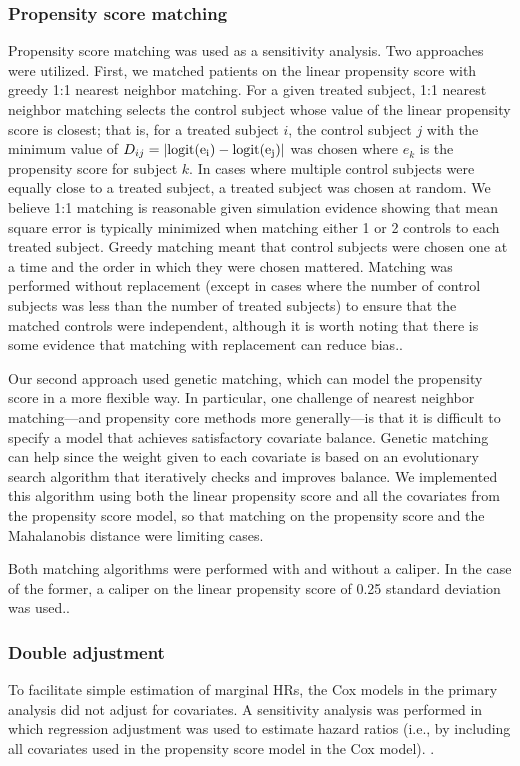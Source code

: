 \documentclass[11pt,final,fleqn]{article}\usepackage[]{graphicx}\usepackage[]{color}
\begin{document}
\subsubsection{Propensity score matching}
Propensity score matching was used as a sensitivity analysis. Two approaches were utilized. First, we matched patients on the linear propensity score with greedy 1:1 nearest neighbor matching. For a given treated subject, 1:1 nearest neighbor matching selects the control subject whose value of the linear propensity score is closest; that is, for a treated subject $i$, the control subject $j$ with the minimum value of $D_{ij}=|\rm{logit}(e_i)-\rm{logit}(e_j)|$ was chosen where $e_{k}$ is the propensity score for subject $k$. In cases where multiple control subjects were equally close to a treated subject, a treated subject was chosen at random. We believe 1:1 matching is reasonable given simulation evidence showing that mean square error is typically minimized when matching either 1 or 2 controls to each treated subject.\cite{austin2010statistical} Greedy matching meant that control subjects were chosen one at a time and the order in which they were chosen mattered. Matching was performed without replacement (except in cases where the number of control subjects was less than the number of treated subjects) to ensure that the matched controls were independent, although it is worth noting that there is some evidence that matching with replacement can reduce bias.\cite{abadie2006large, stuart2010matching}.

Our second approach used genetic matching, which can model the propensity score in a more flexible way.\cite{sekhon2008multivariate, diamond2013genetic}  In particular, one challenge of nearest neighbor matching---and propensity core methods more generally---is that it is difficult to specify a model that achieves satisfactory covariate balance. Genetic matching can help since the weight given to each covariate is based on an evolutionary search algorithm that iteratively checks and improves balance. We implemented this algorithm using both the linear propensity score and all the covariates from the propensity score model, so that matching on the propensity score and the Mahalanobis distance were limiting cases.

Both matching algorithms  were performed with and without a caliper. In the case of the former, a caliper on the linear propensity score of 0.25 standard deviation was used.\cite{rosenbaum1985constructing}.

\subsubsection{Double adjustment}
To facilitate simple estimation of marginal HRs, the Cox models in the primary analysis did not adjust for covariates. A sensitivity analysis was performed in which regression adjustment was used to estimate hazard ratios (i.e., by including all covariates used in the propensity score model in the Cox model). \cite{rubin1973use, nguyen2017double}.
\end{document}
